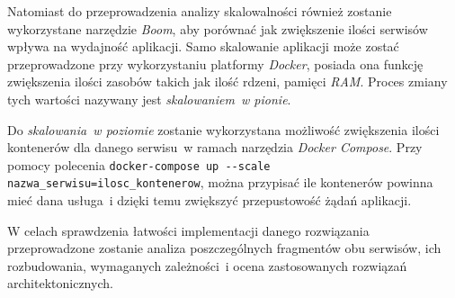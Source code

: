 Natomiast do przeprowadzenia analizy skalowalności również zostanie wykorzystane narzędzie \textit{Boom}, aby porównać jak zwiększenie ilości serwisów wpływa na wydajność aplikacji. Samo skalowanie aplikacji może zostać przeprowadzone przy wykorzystaniu platformy \textit{Docker}, posiada ona funkcję zwiększenia ilości zasobów takich jak ilość rdzeni, pamięci \textit{RAM}. Proces zmiany tych wartości nazywany jest \textit{skalowaniem~w pionie}\cite{Folwer:2019}.

Do \textit{skalowania~w poziomie}\cite{Folwer:2019} zostanie wykorzystana możliwość zwiększenia ilości kontenerów dla danego serwisu~w ramach narzędzia \textit{Docker Compose}. Przy pomocy polecenia \verb|docker-compose up --scale nazwa_serwisu=ilosc_kontenerow|, można przypisać ile kontenerów powinna mieć dana usługa~i dzięki temu zwiększyć przepustowość żądań aplikacji\cite{docker}.

W celach sprawdzenia łatwości implementacji danego rozwiązania przeprowadzone zostanie analiza poszczególnych fragmentów obu serwisów, ich rozbudowania, wymaganych zależności~i ocena zastosowanych rozwiązań architektonicznych.

